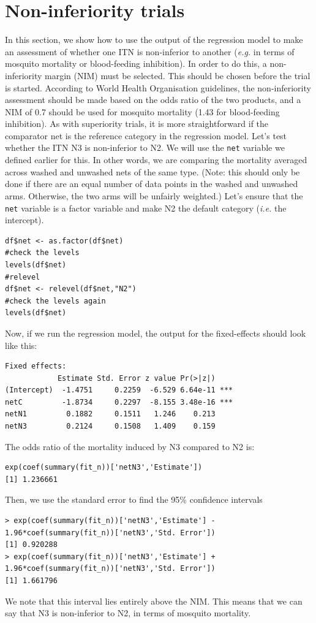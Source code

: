 \documentclass[11pt]{article}
\begin{document}
\section{Non-inferiority trials}

In this section, we show how to use the output of the regression model to make an assessment of whether one ITN is non-inferior to another (\textit{e.g.} in terms of mosquito mortality or blood-feeding inhibition). In order to do this, a non-inferiority margin (NIM) must be selected. This should be chosen before the trial is started. According to World Health Organisation guidelines, the non-inferiority assessment should be made based on the odds ratio of the two products, and a NIM of 0.7 should be used for mosquito mortality (1.43 for blood-feeding inhibition). As with superiority trials, it is more straightforward if the comparator net is the reference category in the regression model. Let's test whether the ITN N3 is non-inferior to N2. We will use the \verb+net+ variable we defined earlier for this. In other words, we are comparing the mortality averaged across washed and unwashed nets of the same type. (Note: this should only be done if there are an equal number of data points in the washed and unwashed arms. Otherwise, the two arms will be unfairly weighted.) Let's ensure that the \verb+net+ variable is a factor variable and make N2 the default category (\textit{i.e.} the intercept).
\begin{verbatim}
df$net <- as.factor(df$net)
#check the levels
levels(df$net)
#relevel
df$net <- relevel(df$net,"N2") 
#check the levels again
levels(df$net)
\end{verbatim}
Now, if we run the regression model, the output for the fixed-effects should look like this:
\begin{verbatim}
Fixed effects:
            Estimate Std. Error z value Pr(>|z|)    
(Intercept)  -1.4751     0.2259  -6.529 6.64e-11 ***
netC         -1.8734     0.2297  -8.155 3.48e-16 ***
netN1         0.1882     0.1511   1.246    0.213    
netN3         0.2124     0.1508   1.409    0.159    
\end{verbatim}
The odds ratio of the mortality induced by N3 compared to N2 is:
\begin{verbatim}
exp(coef(summary(fit_n))['netN3','Estimate'])
[1] 1.236661
\end{verbatim}
Then, we use the standard error to find the 95\% confidence intervals
\begin{verbatim}
> exp(coef(summary(fit_n))['netN3','Estimate'] -
1.96*coef(summary(fit_n))['netN3','Std. Error'])
[1] 0.920288
> exp(coef(summary(fit_n))['netN3','Estimate'] +
1.96*coef(summary(fit_n))['netN3','Std. Error'])
[1] 1.661796
\end{verbatim}
We note that this interval lies entirely above the NIM. This means that we can say that N3 is non-inferior to N2, in terms of mosquito mortality.
\end{document}
